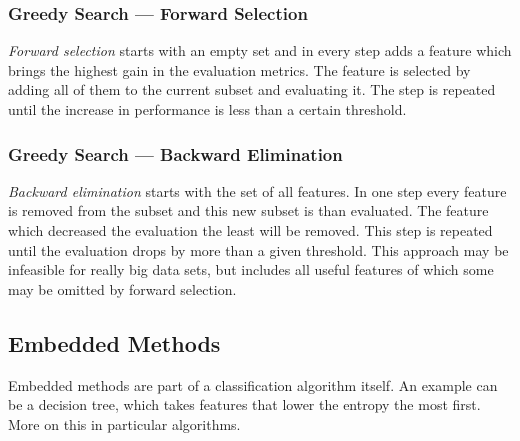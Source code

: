 
\subsubsection{Greedy Search --- Forward Selection}

{\it Forward selection} starts with an empty set and in every step adds a feature which brings the highest gain in the evaluation metrics. The feature is selected by adding all of them to the current  subset and evaluating it. The step is repeated until the increase in performance is less than a certain threshold. 

\subsubsection{Greedy Search --- Backward Elimination}

{\it Backward elimination} starts with the set of all features. In one step every feature is removed from the subset and this new subset is than evaluated. The feature which decreased the evaluation the least will be removed. This step is repeated until the evaluation drops by more than a given threshold. This approach may be infeasible for really big data sets, but includes all useful features of which some may be omitted by forward selection.




\subsection{Embedded Methods}

Embedded methods are part of a classification algorithm itself. An example can be a decision tree, which takes features that lower the entropy the most first. More on this in particular algorithms.





